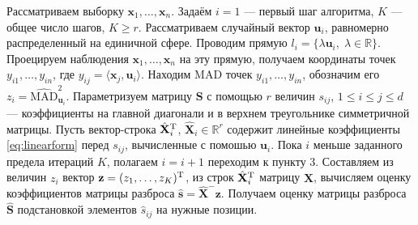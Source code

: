 \begin{algorithm}[H]
\caption{Наивное вычисление оценки матрицы разброса вдоль случайных направлений}
\begin{algorithmic}[1]
			\State Рассматриваем выборку $\mathbf{x}_1,\ldots,\mathbf{x}_{{n}}$. 
			\State Задаём $i=1$ --- первый шаг алгоритма, $K$ --- общее число шагов, $K \geqslant r$. 
			\State Рассматриваем случайный вектор $\mathbf{u}_i$, равномерно распределенный на единичной сфере. Проводим прямую  $l_i=\{\lambda\mathbf{u}_{{i}},\;\lambda\in\mathbb{R}\}.$
			\State Проецируем наблюдения $\mathbf{x}_1,\ldots,\mathbf{x}_{{n}}$ на эту прямую, получаем координаты точек~$y_{i1},\ldots,y_{in}$, где $y_{ij} = \langle \mathbf{x}_j, \mathbf{u}_{{i}} \rangle$.
			\State Находим MAD точек $y_{i1},\ldots,y_{in}$, обозначим его $z_i = \widehat{\text{MAD}}^2_{\mathbf{u}_i}$.
            \State Параметризуем матрицу $\mathbf{S}$ с помощью $r$ величин $s_{ij}$, $1 \leqslant i \leqslant j \leqslant d$ --- коэффициенты на главной диагонали и в верхнем треугольнике симметричной матрицы. Пусть вектор-строка $\hat{\mathbf{X}}_i^{\mathrm{T}} $, $\hat{\mathbf{X}}_i \in \mathbb{R}^r$ содержит линейные коэффициенты \eqref{eq:linearform} перед $s_{ij}$, вычисленные с помошью $\mathbf{u}_{{i}}$.
            \State Пока $i$ меньше заданного предела итераций $K$, полагаем $i = i + 1$ переходим к пункту 3.
			\State Составляем из величин $z_i$ вектор $\mathbf{z} = (z_1, \ldots, z_K)^{\mathrm{T}}$, из строк $\hat{\mathbf{X}}_i^{\mathrm{T}} $ матрицу $\hat{\mathbf{X}}$, вычисляем оценку коэффициентов матрицы разброса $\hat{\mathbf{s}} = \hat{\mathbf{X}}^- \mathbf{z}$.
            \State Получаем оценку матрицы разброса $\widehat{\mathbf{S}}$ подстановкой элементов $\hat s_{ij}$ на нужные позиции.
\end{algorithmic}
\label{alg:dispercematrix_naive}
\end{algorithm}





    
